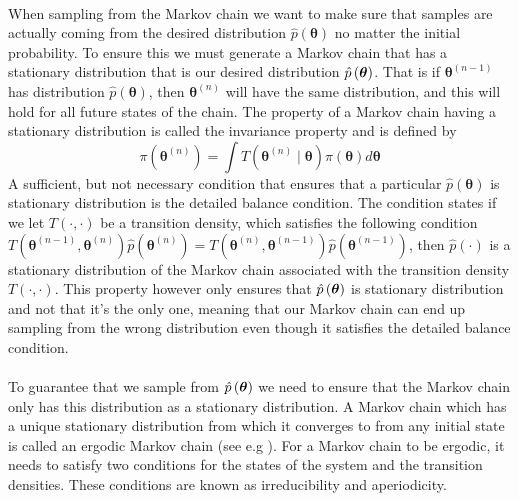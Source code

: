 \\
When sampling from the Markov chain we want to make sure that samples are actually coming from the desired distribution $\hat{p}(\boldsymbol{\theta})$ no matter the initial probability. To ensure this we must generate a Markov chain that has a stationary distribution that is our desired distribution $\hat{p}\left (\boldsymbol{\theta}\right)$. That is if $\boldsymbol{\theta}^{(n-1)}$ has distribution $\hat{p}(\boldsymbol{\theta})$, then  $\boldsymbol{\theta}^{(n)}$ will have the same distribution, and this will hold for all future states of the chain. The property of a Markov chain having a stationary distribution is called the invariance property and is defined by
\begin{equation*}
    \pi(\boldsymbol{\theta}^{(n)})=\int T(\boldsymbol{\theta}^{(n)}\mid \boldsymbol{\theta}) \pi(\boldsymbol{\theta})d\boldsymbol{\theta}
\end{equation*}
A sufficient, but not necessary condition that ensures that a particular $\hat{p}(\boldsymbol{\theta})$ is stationary distribution is the detailed balance condition. The condition states if we let $T(\cdot,\cdot)$ be a transition density, which satisfies the following condition $T(\boldsymbol{\theta}^{(n-1)}, \boldsymbol{\theta}^{(n)}) \hat{p}(\boldsymbol{\theta}^{(n)})= T(\boldsymbol{\theta}^{(n)}, \boldsymbol{\theta}^{(n-1)})\hat{p}(\boldsymbol{\theta}^{(n-1)})$, then $\hat{p}(\cdot)$ is a stationary distribution of the Markov chain associated with the transition density $T(\cdot,\cdot)$. This property however only ensures that $\hat{p}\left (\boldsymbol{\theta}\right)$ is stationary distribution and not that it's the only one, meaning that our Markov chain can end up sampling from the wrong distribution even though it satisfies the detailed balance condition.
\\
\\
To guarantee that we sample from $\hat{p} \left (\boldsymbol{\theta}\right)$ we need to ensure that the Markov chain only has this distribution as a stationary distribution. A Markov chain which has a unique stationary distribution from which it converges to from any initial state is called an ergodic Markov chain (see e.g \cite{turkman2019computational}). For a Markov chain to be ergodic, it needs to satisfy two conditions for the states of the system and the transition densities. These conditions are known as irreducibility and aperiodicity. 
\\
\\

